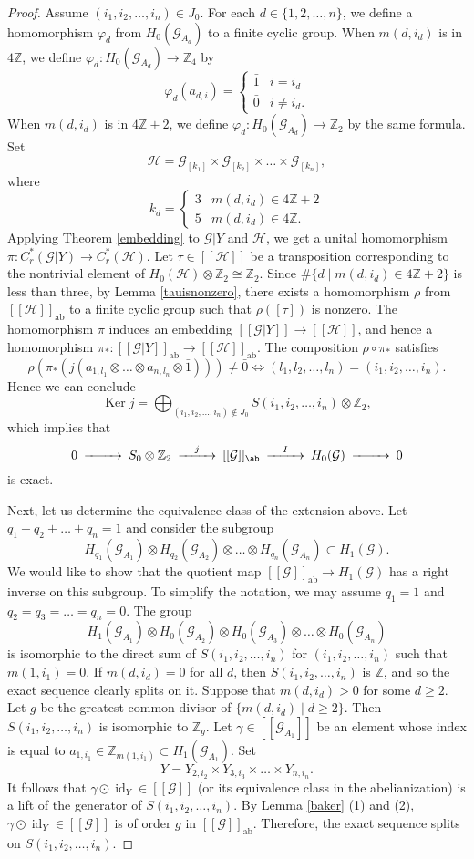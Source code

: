 \documentclass[11pt]{article}
\theoremstyle{definition}
\numberwithin{equation}{section}
\renewcommand{\phi}{\varphi}
\newcommand{\id}{\operatorname{id}}
\newcommand{\Ker}{\operatorname{Ker}}
\newcommand{\ab}{\mathrm{ab}}
\newcommand{\G}{\mathcal{G}}
\renewcommand{\H}{\mathcal{H}}
\newcommand{\Z}{\mathbb{Z}}
\begin{document}
\begin{proof}
Assume $(i_1,i_2,\dots,i_n)\in J_0$. 
For each $d\in\{1,2,\dots,n\}$, we define a homomorphism $\phi_d$ 
from $H_0(\G_{A_d})$ to a finite cyclic group. 
When $m(d,i_d)$ is in $4\Z$, we define $\phi_d:H_0(\G_{A_d})\to\Z_4$ by 
\[
\phi_d(a_{d,i})=\begin{cases}\bar{1}&i=i_d\\\bar{0}&i\neq i_d. \end{cases}
\]
When $m(d,i_d)$ is in $4\Z{+}2$, 
we define $\phi_d:H_0(\G_{A_d})\to\Z_2$ by the same formula. 
Set 
\[
\H=\G_{[k_1]}\times\G_{[k_2]}\times\dots\times\G_{[k_n]}, 
\]
where 
\[
k_d=\begin{cases}3&m(d,i_d)\in4\Z{+}2\\5&m(d,i_d)\in4\Z. \end{cases}
\]
Applying Theorem \ref{embedding} to $\G|Y$ and $\H$, 
we get a unital homomorphism $\pi:C^*_r(\G|Y)\to C^*_r(\H)$. 
Let $\tau\in[[\H]]$ be a transposition 
corresponding to the nontrivial element of $H_0(\H)\otimes\Z_2\cong\Z_2$. 
Since $\#\{d\mid m(d,i_d)\in4\Z{+}2\}$ is less than three, 
by Lemma \ref{tauisnonzero}, there exists a homomorphism $\rho$ 
from $[[\H]]_\ab$ to a finite cyclic group 
such that $\rho([\tau])$ is nonzero. 
The homomorphism $\pi$ induces an embedding $[[\G|Y]]\to[[\H]]$, 
and hence a homomorphism $\pi_*:[[\G|Y]]_\ab\to[[\H]]_\ab$. 
The composition $\rho\circ\pi_*$ satisfies 
\[
\rho(\pi_*(j(a_{1,l_1}\otimes\dots\otimes a_{n,l_n}\otimes\bar{1})))
\neq\bar{0}
\iff(l_1,l_2,\dots,l_n)=(i_1,i_2,\dots,i_n). 
\]
Hence we can conclude 
\[
\Ker j
=\bigoplus_{(i_1,i_2,\dots,i_n)\notin J_0}S(i_1,i_2,\dots,i_n)\otimes\Z_2, 
\]
which implies that 
\[
\begin{CD}
0@>>>S_0\otimes\Z_2@>j>>[[\G]]_\ab@>I>>H_0(\G)@>>>0
\end{CD}
\]
is exact. 

Next, let us determine the equivalence class of the extension above. 
Let $q_1+q_2+\dots+q_n=1$ and consider the subgroup 
\[
H_{q_1}(\G_{A_1})\otimes H_{q_2}(\G_{A_2})\otimes\dots
\otimes H_{q_n}(\G_{A_n})\subset H_1(\G). 
\]
We would like to show that 
the quotient map $[[\G]]_\ab\to H_1(\G)$ has a right inverse on this subgroup. 
To simplify the notation, 
we may assume $q_1=1$ and $q_2=q_3=\dots=q_n=0$. 
The group 
\[
H_1(\G_{A_1})\otimes H_0(\G_{A_2})\otimes H_0(\G_{A_3})\otimes\dots
\otimes H_0(\G_{A_n})
\]
is isomorphic to the direct sum of $S(i_1,i_2,\dots,i_n)$ 
for $(i_1,i_2,\dots,i_n)$ such that $m(1,i_1)=0$. 
If $m(d,i_d)=0$ for all $d$, then $S(i_1,i_2,\dots,i_n)$ is $\Z$, 
and so the exact sequence clearly splits on it. 
Suppose that $m(d,i_d)>0$ for some $d\geq2$. 
Let $g$ be the greatest common divisor of $\{m(d,i_d)\mid d\geq2\}$. 
Then $S(i_1,i_2,\dots,i_n)$ is isomorphic to $\Z_g$. 
Let $\gamma\in[[\G_{A_1}]]$ be an element 
whose index is equal to $a_{1,i_1}\in\Z_{m(1,i_1)}\subset H_1(\G_{A_1})$. 
Set 
\[
Y=Y_{2,i_2}\times Y_{3,i_3}\times\dots\times Y_{n,i_n}. 
\]
It follows that $\gamma\odot\id_Y\in[[\G]]$ 
(or its equivalence class in the abelianization) is a lift 
of the generator of $S(i_1,i_2,\dots,i_n)$. 
By Lemma \ref{baker} (1) and (2), 
$\gamma\odot\id_Y\in[[\G]]$ is of order $g$ in $[[\G]]_\ab$. 
Therefore, the exact sequence splits on $S(i_1,i_2,\dots,i_n)$. 


\end{proof}
\end{document}
